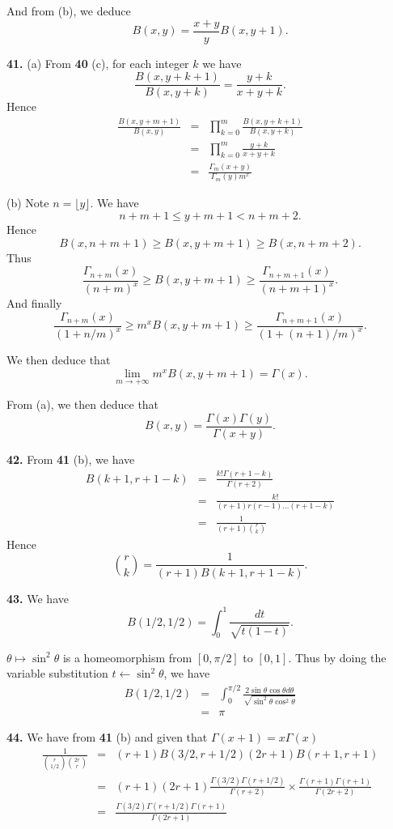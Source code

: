 \documentclass[a4paper,12pt]{article}
\newcommand{\newpar}[1]{\bigskip \noindent \textbf{#1.}}
\newcommand{\subpar}[1]{\medskip \noindent (#1)}
\newcommand{\la}{\leftarrow}
\begin{document}
And from (b), we deduce
\[ B(x, y) = \frac{x+y}{y} B(x, y+1).\]

\newpar{41} \subpar{a} From \textbf{40} (c), for each integer $k$ we have
\[ \frac{B(x, y + k + 1)}{B(x, y+k)} = \frac{y + k}{x+y+k}.\]
Hence
\begin{eqnarray*}
  \frac{B(x, y+m+1)}{B(x, y)} &=& \prod_{k=0}^m \frac{B(x,
    y+k+1)}{B(x, y+k)} \\
  &=& \prod_{k=0}^m \frac{y+k}{x+y+k} \\
  &=& \frac{\Gamma_m(x+y)}{\Gamma_m(y)m^x}
\end{eqnarray*}

\subpar{b} Note $n = \lfloor y\rfloor$.  We have
\[ n + m + 1 \le y + m + 1 < n+m+2.\]
Hence
\[ B(x, n+m+1) \ge B(x, y+m+1) \ge B(x, n+m+2).\]
Thus
\[ \frac{\Gamma_{n+m}(x)}{(n+m)^x} \ge B(x, y+m+1) \ge
\frac{\Gamma_{n+m+1}(x)}{(n+m+1)^x}.\]
And finally
\[ \frac{\Gamma_{n+m}(x)}{(1+n/m)^x} \ge m^x B(x, y+m+1) \ge
\frac{\Gamma_{n+m+1}(x)}{(1+(n+1)/m)^x}.\]

We then deduce that
\[ \lim_{m \to +\infty} m^x B(x, y+m+1) = \Gamma(x).\]

From (a), we then deduce that
\[ B(x, y) = \frac{\Gamma(x) \Gamma(y)}{\Gamma(x+y)}.\]

\newpar{42}  From \textbf{41} (b), we have
\begin{eqnarray*}
  B(k+1, r+1-k) &=& \frac{k!\Gamma(r+1-k)}{\Gamma(r+2)} \\
  &=& \frac{k!}{(r+1)r(r-1) \ldots (r+1-k)} \\
  &=& \frac{1}{(r+1){r \choose k}}
\end{eqnarray*}
Hence
\[ {r \choose k} = \frac{1}{(r+1)B(k+1, r+1-k)}.\]

\newpar{43} We have
\[ B(1/2, 1/2) = \int_0^1 \frac{dt}{\sqrt{t(1-t)}}.\]

$\theta \mapsto \sin^2\theta$ is a homeomorphism from $[0, \pi/2]$ to
$[0, 1]$. Thus by doing the variable substitution $t \la
\sin^2\theta$, we have
\begin{eqnarray*}
  B(1/2, 1/2) &=& \int_0^{\pi/2} \frac{2 \sin\theta \cos\theta
    d\theta}{\sqrt{\sin^2\theta \cos^2\theta}} \\
  &=& \pi
\end{eqnarray*}

\newpar{44} We have from \textbf{41} (b) and given that $\Gamma(x+1) =
x\Gamma(x)$
\begin{eqnarray*}
  \frac{1}{{r \choose 1/2} {2r \choose r}} &=&
  (r+1)B(3/2,r+1/2)(2r+1)B(r+1, r+1) \\
  &=& (r+1)(2r+1)
  \frac{\Gamma(3/2)\Gamma(r+1/2)}{\Gamma(r+2)}\times\frac{\Gamma(r+1)\Gamma(r+1)}{\Gamma(2r+2)}
  \\ &=& \frac{\Gamma(3/2)\Gamma(r+1/2) \Gamma(r+1)}{\Gamma(2r+1)} \\
\end{eqnarray*}
\end{document}
